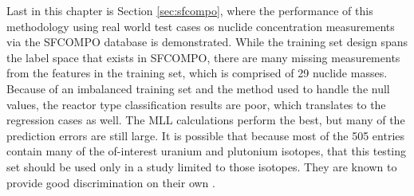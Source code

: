 Last in this chapter is Section \ref{sec:sfcompo}, where the performance of
this methodology using real world test cases os nuclide concentration
measurements via the \gls{SFCOMPO} database is demonstrated.  While the
training set design spans the label space that exists in \gls{SFCOMPO}, there
are many missing measurements from the features in the training set, which is
comprised of 29 nuclide masses.  Because of an imbalanced training set and the
method used to handle the null values, the reactor type classification results
are poor, which translates to the regression cases as well.  The \gls{MLL}
calculations perform the best, but many of the prediction errors are still
large. It is possible that because most of the 505 entries contain many of the
of-interest uranium and plutonium isotopes, that this testing set should be
used only in a study limited to those isotopes. They are known to provide good
discrimination on their own \cite{pu_discrimination, nicolaou_2006,
nicolaou_pu, nicolaou_2009, nicolaou_2014, nicolaou_2015}.
